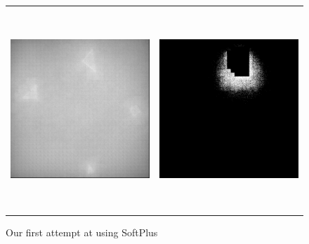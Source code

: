 \begin{figure}
    \begin{center}
        \begin{tabular}{c c}
            \includegraphics[width = 3in, height = 3in]{Counting/LaTeX/figures/putasideall/nolimitscaleresamplingoptiondifferentactivation3networkputaside/image1/saliency.png} & \includegraphics[width = 3in, height = 3in]{Counting/LaTeX/figures/putasideall/nolimitscaleresamplingoptiondifferentactivation3networkputaside/image1/1.png}
        \end{tabular}
    \end{center}
    \caption{Our first attempt at using SoftPlus~\cite{NIPS2000_44968aec}}
    \label{norenormalizationsoftplus}
\end{figure}

